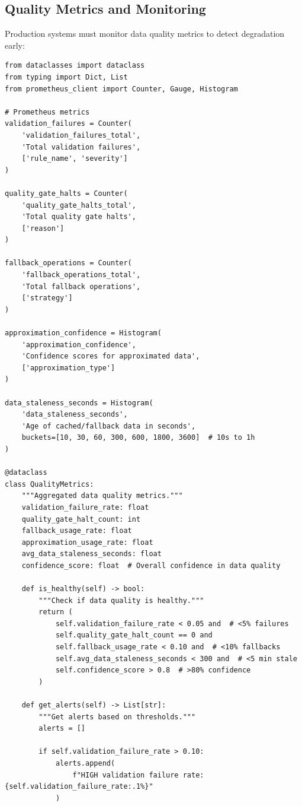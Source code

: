 \subsection{Quality Metrics and Monitoring}

Production systems must monitor data quality metrics to detect degradation early:

\begin{lstlisting}[style=python, caption={Quality Monitoring Dashboard}]
from dataclasses import dataclass
from typing import Dict, List
from prometheus_client import Counter, Gauge, Histogram

# Prometheus metrics
validation_failures = Counter(
    'validation_failures_total',
    'Total validation failures',
    ['rule_name', 'severity']
)

quality_gate_halts = Counter(
    'quality_gate_halts_total',
    'Total quality gate halts',
    ['reason']
)

fallback_operations = Counter(
    'fallback_operations_total',
    'Total fallback operations',
    ['strategy']
)

approximation_confidence = Histogram(
    'approximation_confidence',
    'Confidence scores for approximated data',
    ['approximation_type']
)

data_staleness_seconds = Histogram(
    'data_staleness_seconds',
    'Age of cached/fallback data in seconds',
    buckets=[10, 30, 60, 300, 600, 1800, 3600]  # 10s to 1h
)

@dataclass
class QualityMetrics:
    """Aggregated data quality metrics."""
    validation_failure_rate: float
    quality_gate_halt_count: int
    fallback_usage_rate: float
    approximation_usage_rate: float
    avg_data_staleness_seconds: float
    confidence_score: float  # Overall confidence in data quality

    def is_healthy(self) -> bool:
        """Check if data quality is healthy."""
        return (
            self.validation_failure_rate < 0.05 and  # <5% failures
            self.quality_gate_halt_count == 0 and
            self.fallback_usage_rate < 0.10 and  # <10% fallbacks
            self.avg_data_staleness_seconds < 300 and  # <5 min stale
            self.confidence_score > 0.8  # >80% confidence
        )

    def get_alerts(self) -> List[str]:
        """Get alerts based on thresholds."""
        alerts = []

        if self.validation_failure_rate > 0.10:
            alerts.append(
                f"HIGH validation failure rate: {self.validation_failure_rate:.1%}"
            )


\end{lstlisting}
